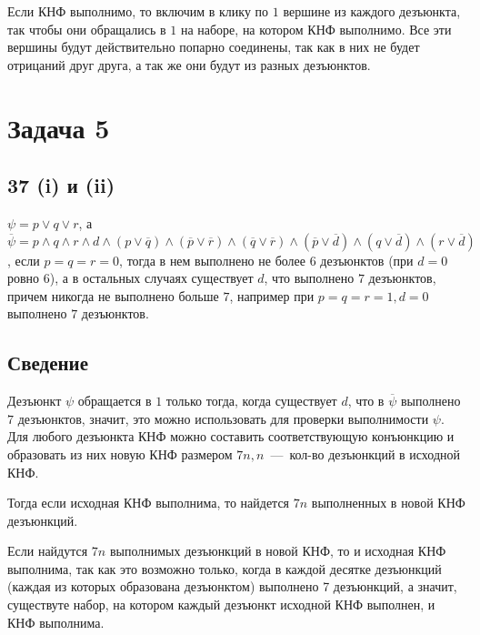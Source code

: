 \documentclass[a4paper,12pt]{article} %
\begin{document}
Если КНФ выполнимо, то включим в клику по $1$ вершине из каждого дезъюнкта, так чтобы они обращались в $1$ на наборе, на котором КНФ выполнимо. Все эти вершины будут действительно попарно соединены, так как в них не будет отрицаний друг друга,  а так же они будут из разных дезъюнктов.

\section{Задача 5}
\subsection{37 (i) и (ii)}
\hspace{5mm}
$\psi=p\vee q\vee r$, а $\overline\psi=p\wedge q\wedge r\wedge d\wedge (p\vee \overline q)\wedge(\overline p\vee\overline r)\wedge(\overline q\vee\overline r)\wedge(\overline p\vee \overline d)\wedge(q\vee \overline d)\wedge(r\vee \overline d)$, если $p=q=r=0$, тогда в нем выполнено не более $6$ дезъюнктов (при $d=0$ ровно $6$), а в остальных случаях существует $d$, что выполнено $7$ дезъюнктов, причем никогда не выполнено больше $7$, например при $p=q=r=1,d=0$ выполнено $7$ дезъюнктов.


\subsection{Сведение}
\hspace{5mm}
Дезъюнкт $\psi$ обращается в $1$ только тогда, когда существует $d$, что в $\overline\psi$ выполнено $7$ дезъюнктов, значит, это можно использовать для проверки выполнимости $\psi$. Для любого дезъюнкта КНФ можно составить соответствующую конъюнкцию и образовать из них новую КНФ размером $7n,n$~---~кол-во дезъюнкций в исходной КНФ. 

Тогда если исходная КНФ выполнима, то найдется $7n$ выполненных в новой КНФ дезъюнкций. 

Если найдутся $7n$ выполнимых дезъюнкций в новой КНФ, то и исходная КНФ выполнима, так как это возможно только, когда в каждой десятке дезъюнкций (каждая из которых образована дезъюнктом) выполнено 7 дезъюнкций, а значит, существуте набор, на котором каждый дезъюнкт исходной КНФ выполнен, и КНФ выполнима.
\end{document}
